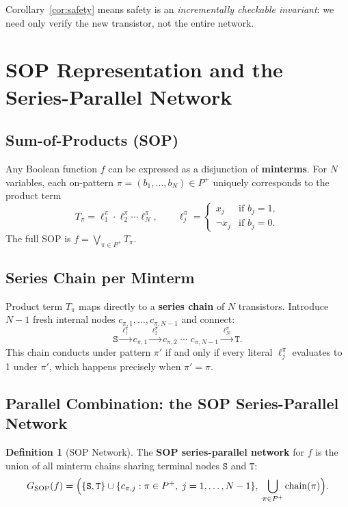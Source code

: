 \documentclass[11pt, a4paper]{article}
\theoremstyle{plain}
\theoremstyle{definition}
\newtheorem{definition}[theorem]{Definition}
\theoremstyle{remark}
\newcommand{\SOURCE}{\texttt{S}}
\newcommand{\SINK}{\texttt{T}}
\newcommand{\Pplus}{P^{+}}
\begin{document}
Corollary~\ref{cor:safety} means safety is an
\emph{incrementally checkable invariant}: we need only verify the
new transistor, not the entire network.

\section{SOP Representation and the Series-Parallel Network}

\subsection{Sum-of-Products (SOP)}

Any Boolean function $f$ can be expressed as a disjunction of
\textbf{minterms}.  For $N$ variables, each on-pattern
$\pi = (b_1, \ldots, b_N) \in \Pplus$ uniquely corresponds to the
product term
\[
  T_\pi
  = \ell_1^\pi \cdot \ell_2^\pi \cdots \ell_N^\pi,
  \qquad
  \ell_j^\pi =
  \begin{cases}
    x_j     & \text{if } b_j = 1,\\
    \lnot x_j & \text{if } b_j = 0.
  \end{cases}
\]
The full SOP is $f = \bigvee_{\pi \in \Pplus} T_\pi$.

\subsection{Series Chain per Minterm}

Product term $T_\pi$ maps directly to a \textbf{series chain} of $N$
transistors.  Introduce $N-1$ fresh internal nodes
$c_{\pi,1}, \ldots, c_{\pi,N-1}$ and connect:
\[
  \SOURCE
    \xrightarrow{\;\ell_1^\pi\;}
  c_{\pi,1}
    \xrightarrow{\;\ell_2^\pi\;}
  c_{\pi,2}
    \;\cdots\;
  c_{\pi,N-1}
    \xrightarrow{\;\ell_N^\pi\;}
  \SINK.
\]
This chain conducts under pattern $\pi'$ if and only if every literal
$\ell_j^\pi$ evaluates to 1 under $\pi'$, which happens precisely
when $\pi' = \pi$.

\subsection{Parallel Combination: the SOP Series-Parallel Network}

\begin{definition}[SOP Network]
The \textbf{SOP series-parallel network} for $f$ is the union of
all minterm chains sharing terminal nodes $\SOURCE$ and $\SINK$:
\[
  G_{\mathrm{SOP}}(f)
  = \Bigl(
      \{\SOURCE, \SINK\}
        \cup \{c_{\pi,j} : \pi \in \Pplus,\; j = 1,\ldots,N-1\},
      \;\bigcup_{\pi \in \Pplus} \mathrm{chain}(\pi)
    \Bigr).
\]
\end{definition}
\end{document}
